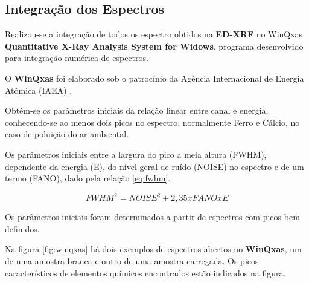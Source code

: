 



\subsection{Integração dos Espectros}

Realizou-se a integração de todos os espectro obtidos na \textbf{ED-XRF} no
WinQxas \textbf{Quantitative X-Ray Analysis System for Widows},
programa desenvolvido para integração numérica de espectros. 

O \textbf{WinQxas} foi elaborado sob o patrocínio da Agência Internacional 
de Energia Atômica (IAEA) \citep{capote2000}.

Obtém-se os parâmetros iniciais da relação linear entre canal e energia,
conhecendo-se ao menos dois picos no espectro, normalmente Ferro e Cálcio, 
no caso de poluição do ar ambiental. 

Os parâmetros iniciais entre a largura do pico a meia altura (FWHM),
dependente da energia (E), do nível geral de ruído (NOISE) no espectro 
e de um termo (FANO), dado pela relação \ref{eq:fwhm}. 

\begin{equation}
  \label{eq:fwhm}
   FWHM^2 = NOISE^2 + 2,35 x FANO  x E
\end{equation}

Os parâmetros iniciais foram determinados a partir de espectros com picos bem definidos.

Na figura \ref{fig:winqxas} há dois exemplos de espectros abertos no \textbf{WinQxas}, 
um de uma amostra branca e outro de uma amostra carregada. 
Os picos característicos de elementos químicos encontrados estão indicados na figura.

